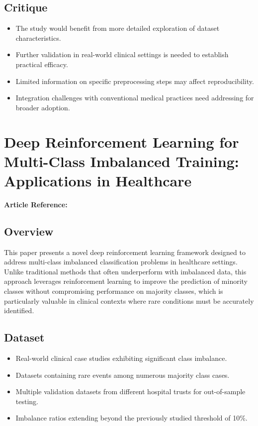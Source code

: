 \subsection*{Critique}
\begin{itemize}
    \item The study would benefit from more detailed exploration of dataset characteristics.
    \item Further validation in real-world clinical settings is needed to establish practical efficacy.
    \item Limited information on specific preprocessing steps may affect reproducibility.
    \item Integration challenges with conventional medical practices need addressing for broader adoption.
\end{itemize}

\section{Deep Reinforcement Learning for Multi-Class Imbalanced Training: Applications in Healthcare}
\textbf{Article Reference:} \cite{article_15}

\subsection*{Overview}
This paper presents a novel deep reinforcement learning framework designed to address multi-class imbalanced classification problems in healthcare settings. Unlike traditional methods that often underperform with imbalanced data, this approach leverages reinforcement learning to improve the prediction of minority classes without compromising performance on majority classes, which is particularly valuable in clinical contexts where rare conditions must be accurately identified.

\subsection*{Dataset}
\begin{itemize}
    \item Real-world clinical case studies exhibiting significant class imbalance.
    \item Datasets containing rare events among numerous majority class cases.
    \item Multiple validation datasets from different hospital trusts for out-of-sample testing.
    \item Imbalance ratios extending beyond the previously studied threshold of 10\%.
\end{itemize}

